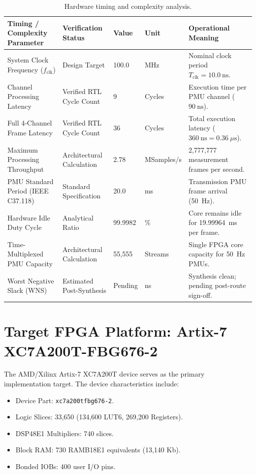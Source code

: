 \documentclass[12pt,a4paper]{report}
\begin{document}
\begin{table}[H]
\centering
\caption{Hardware timing and complexity analysis.}
\label{tab:hardware_timing}
\small
\renewcommand{\arraystretch}{1.25}
\begin{tabular}{|p{4.2cm}|p{3.2cm}|p{2.2cm}|p{1.8cm}|p{3.0cm}|}
\hline
\textbf{Timing / Complexity Parameter} & \textbf{Verification Status} & \textbf{Value} & \textbf{Unit} & \textbf{Operational Meaning} \\
\hline
System Clock Frequency ($f_{\text{clk}}$) & Design Target & 100.0 & MHz & Nominal clock period $T_{\text{clk}} = 10.0~\text{ns}$. \\
\hline
Channel Processing Latency & Verified RTL Cycle Count & 9 & Cycles & Execution time per PMU channel ($90~\text{ns}$). \\
\hline
Full 4-Channel Frame Latency & Verified RTL Cycle Count & 36 & Cycles & Total execution latency ($360~\text{ns} = 0.36~\mu\text{s}$). \\
\hline
Maximum Processing Throughput & Architectural Calculation & 2.78 & MSamples/s & 2,777,777 measurement frames per second. \\
\hline
PMU Standard Period (IEEE C37.118) & Standard Specification & 20.0 & ms & Transmission PMU frame arrival (50~Hz). \\
\hline
Hardware Idle Duty Cycle & Analytical Ratio & 99.9982 & \% & Core remains idle for 19.99964~ms per frame. \\
\hline
Time-Multiplexed PMU Capacity & Architectural Calculation & 55,555 & Streams & Single FPGA core capacity for 50~Hz PMUs. \\
\hline
Worst Negative Slack (WNS) & Estimated Post-Synthesis & Pending & ns & Synthesis clean; pending post-route sign-off. \\
\hline
\end{tabular}
\end{table}

\section{Target FPGA Platform: Artix-7 XC7A200T-FBG676-2}
The AMD/Xilinx Artix-7 XC7A200T device serves as the primary implementation target.
The device characteristics include:
\begin{itemize}
    \item Device Part: \texttt{xc7a200tfbg676-2}.
    \item Logic Slices: 33,650 (134,600 LUT6, 269,200 Registers).
    \item DSP48E1 Multipliers: 740 slices.
    \item Block RAM: 730 RAMB18E1 equivalents (13,140 Kb).
    \item Bonded IOBs: 400 user I/O pins.
\end{itemize}
\end{document}
